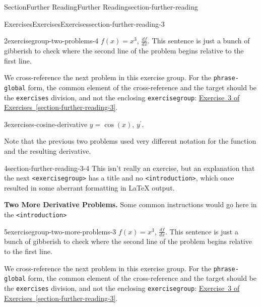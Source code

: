 \documentclass[twoside,10pt,]{article}
\newcommand{\xreffont}{\relax}
\newcommand{\mono}[1]{\texttt{#1}}
\numberwithin{equation}{section}
\begin{document}
\begin{sectionptx}{Section}{Further Reading}{}{Further Reading}{}{}{section-further-reading}
\begin{exercises-subsection}{Exercises}{Exercises}{}{Exercises}{}{}{section-further-reading-3}
\begin{exercisegroup}
%
\begin{divisionexerciseeg}{2}{}{}{exercisegroup-two-problems-4}%
\(f(x)=x^3\), \(\frac{df}{dx}\).  This sentence is just a bunch of gibberish to check where the second line of the problem begins relative to the first line.%
\par
We cross-reference the next problem in this exercise group.  For the \mono{phrase-global} form, the common element of the cross-reference and the target should be the \mono{exercises} division, and not the enclosing \mono{exercisegroup}:  \hyperlink{exercises-cosine-derivative}{Exercise~3 of Exercises~{\xreffont\ref{section-further-reading-3}}}.%
\end{divisionexerciseeg}%
\begin{divisionexerciseeg}{3}{}{}{exercises-cosine-derivative}%
%
\(y = \cos(x)\), \(y^\prime\).%
\end{divisionexerciseeg}%
\end{exercisegroup}
\par\noindent%
Note that the previous two problems used very different notation for the function and the resulting derivative.%
\par\medskip\noindent
\begin{divisionexercise}{4}{}{}{section-further-reading-3-4}%
This isn't really an exercise, but an explanation that the next \mono{<exercisegroup>} has a title and no \mono{<introduction>}, which once resulted in some aberrant formatting in \LaTeX{} output.%
\end{divisionexercise}%
\par\medskip\noindent%
\textbf{Two More Derivative Problems.}\space\space\hypertarget{exercisegroup-two-more-problems}{}%
Some common instructions would go here in the \mono{<introduction>}%
\begin{exercisegroup}
\begin{divisionexerciseeg}{5}{}{}{exercisegroup-two-more-problems-3}%
\(f(x)=x^3\), \(\frac{df}{dx}\).  This sentence is just a bunch of gibberish to check where the second line of the problem begins relative to the first line.%
\par
We cross-reference the next problem in this exercise group.  For the \mono{phrase-global} form, the common element of the cross-reference and the target should be the \mono{exercises} division, and not the enclosing \mono{exercisegroup}:  \hyperlink{exercises-cosine-derivative}{Exercise~3 of Exercises~{\xreffont\ref{section-further-reading-3}}}.%

\end{divisionexerciseeg}
\end{exercisegroup}
\end{exercises-subsection}
\end{sectionptx}
\end{document}
